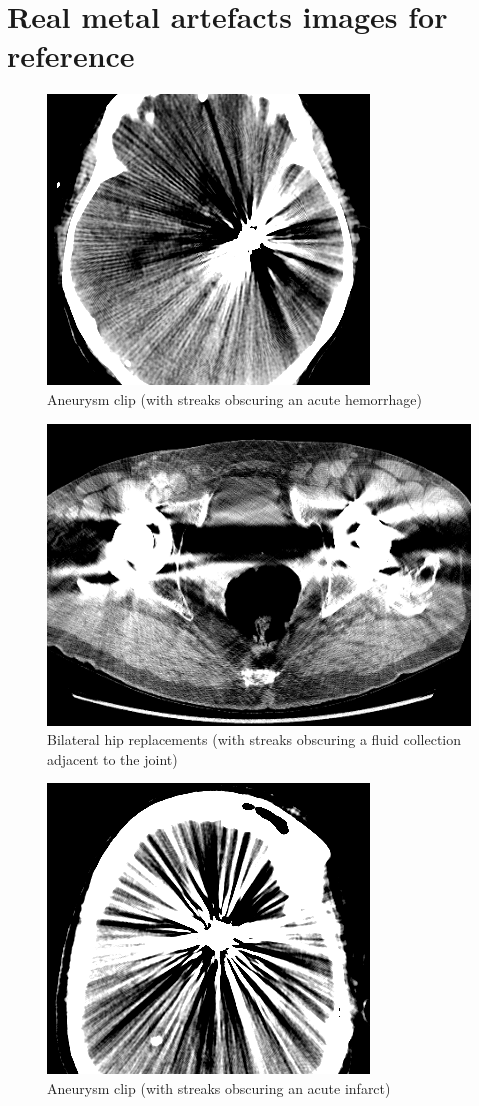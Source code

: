 \appendix %
\chapter{Real metal artefacts images for reference}
\label{chapter:RealMetal}

\begin{figure}[h!]
	\centering
	\includegraphics[width=0.5\linewidth]{images/15_FBP.png}
	\caption{Aneurysm clip (with streaks obscuring an acute hemorrhage)\cite{revisionrads}}
\end{figure}
\begin{figure}[h!]
	\centering
	\includegraphics[width=0.5\linewidth]{images/14_FBP.png}
	\caption{Bilateral hip replacements (with streaks obscuring a fluid collection adjacent to the joint)\cite{revisionrads}}
\end{figure}
\begin{figure}[h!]
	\centering
	\includegraphics[width=0.5\linewidth]{images/13_FBP.png}
	\caption{Aneurysm clip (with streaks obscuring an acute infarct)\cite{revisionrads}}
\end{figure}
